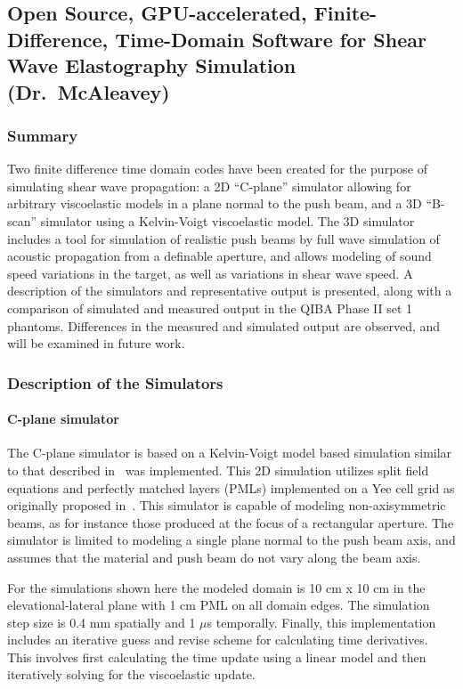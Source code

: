 \subsection{Open Source, GPU-accelerated, Finite-Difference, Time-Domain
    Software for Shear Wave Elastography Simulation (Dr.\ McAleavey)}

\subsubsection{Summary}
Two finite difference time domain codes have been created for the purpose of
simulating shear wave propagation: a 2D ``C-plane'' simulator allowing for
arbitrary viscoelastic models in a plane normal to the push beam, and a 3D
“B-scan” simulator using a Kelvin-Voigt viscoelastic model. The 3D simulator
includes a tool for simulation of realistic push beams by full wave simulation
of acoustic propagation from a definable aperture, and allows modeling of sound
speed variations in the target, as well as variations in shear wave speed. A
description of the simulators and representative output is presented, along
with a comparison of simulated and measured output in the QIBA Phase II set 1
phantoms. Differences in the measured and simulated output are observed, and
will be examined in future work. 

\subsubsection{Description of the Simulators}

\paragraph{C-plane simulator}
The C-plane simulator is based on a Kelvin-Voigt model based simulation similar
to that described in~\cite{Orescanin2011} was implemented. This 2D simulation
utilizes split field equations and perfectly matched layers (PMLs) implemented
on a Yee cell grid as originally proposed in~\cite{Berenger1994}. This
simulator is capable of modeling non-axisymmetric beams, as for instance those
produced at the focus of a rectangular aperture. The simulator is limited to
modeling a single plane normal to the push beam axis, and assumes that the
material and push beam do not vary along the beam axis. 

For the simulations shown here the modeled domain is 10 cm x 10 cm in the
elevational-lateral plane with 1 cm PML on all domain edges. The simulation
step size is 0.4 mm spatially and 1 $\mu$s temporally. Finally, this
implementation includes an iterative guess and revise scheme for calculating
time derivatives.  This involves first calculating the time update using a
linear model and then iteratively solving for the viscoelastic update. 

